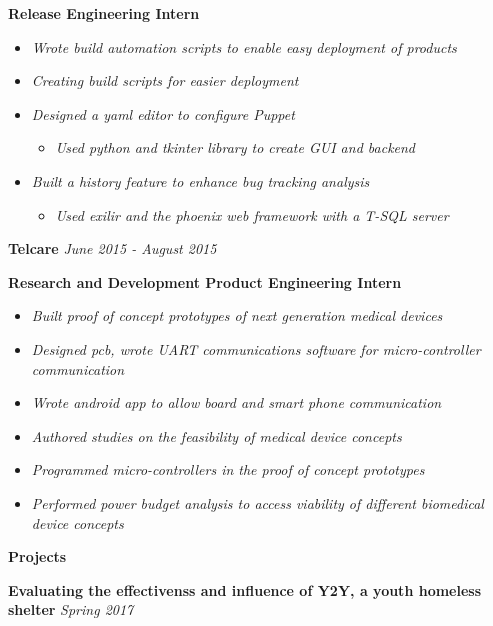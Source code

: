 \documentclass[8pt]{extarticle}
\begin{document}
\textbf{Release Engineering Intern } 
\begin{itemize}
\item \textit{Wrote build automation scripts to enable easy deployment of products}
\item \textit{Creating build scripts for easier deployment}
\item \textit{Designed a yaml editor to configure Puppet}
\begin{itemize}
\item \textit{Used python and tkinter library to create GUI and backend}
\end{itemize}
\item \textit{Built a history feature to enhance bug tracking analysis}
\begin{itemize}
\item \textit{Used exilir and the phoenix web framework with a T-SQL server}
\end{itemize}
\end{itemize}
\textbf{Telcare} \textit{June  2015 - August 2015}

\textbf{Research and Development Product Engineering Intern} 
\begin{itemize}
\item \textit{Built proof of concept prototypes of next generation medical devices}
\item \textit{Designed pcb, wrote UART communications software for micro-controller communication}
\item \textit{Wrote android app to allow board and smart phone communication}
\item \textit{Authored studies on the feasibility of medical device concepts}
\item \textit{Programmed micro-controllers in the proof of concept prototypes}
\item \textit{Performed power budget analysis to access viability of different biomedical device concepts}

\end{itemize}
 \pagebreak
\vspace*{-2.75cm}
\begin{changemargin}{-0.8cm}{0.0cm}
\textbf{Projects}
\end{changemargin}
\vspace*{-0.4cm}
\makebox[\linewidth]{\rule{17cm}{0.4pt}}
\textbf{Evaluating the effectivenss and influence of Y2Y, a youth homeless shelter}  \textit{Spring 2017}
\end{document}
